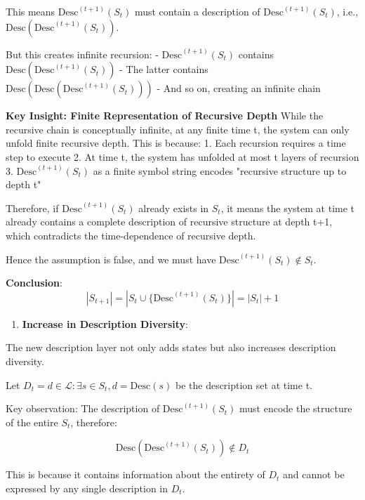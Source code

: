   This means $\text{Desc}^{(t+1)}(S_t)$ must contain a description of $\text{Desc}^{(t+1)}(S_t)$, i.e., $\text{Desc}(\text{Desc}^{(t+1)}(S_t))$.
  
  But this creates infinite recursion:
  - $\text{Desc}^{(t+1)}(S_t)$ contains $\text{Desc}(\text{Desc}^{(t+1)}(S_t))$
  - The latter contains $\text{Desc}(\text{Desc}(\text{Desc}^{(t+1)}(S_t)))$
  - And so on, creating an infinite chain
  
  \textbf{Key Insight: Finite Representation of Recursive Depth}
  While the recursive chain is conceptually infinite, at any finite time t, the system can only unfold finite recursive depth.
  This is because:
  1. Each recursion requires a time step to execute
  2. At time t, the system has unfolded at most t layers of recursion
  3. $\text{Desc}^{(t+1)}(S_t)$ as a finite symbol string encodes "recursive structure up to depth t"
  
  Therefore, if $\text{Desc}^{(t+1)}(S_t)$ already exists in $S_t$, it means the system at time t already contains
  a complete description of recursive structure at depth t+1, which contradicts the time-dependence of recursive depth.
  
  Hence the assumption is false, and we must have $\text{Desc}^{(t+1)}(S_t) \notin S_t$.
  
  \textbf{Conclusion}:
\begin{equation}
|S_{t+1}| = |S_t \cup \{\text{Desc}^{(t+1)}(S_t)\}| = |S_t| + 1
\end{equation}

\begin{enumerate}
\item \textbf{Increase in Description Diversity}:
\end{enumerate}
  The new description layer not only adds states but also increases description diversity.
  
  Let $D_t = {d \in \mathcal{L}: \exists s \in S_t, d = \text{Desc}(s)}$ be the description set at time t.
  
  Key observation: The description of $\text{Desc}^{(t+1)}(S_t)$ must encode the structure of the entire $S_t$, therefore:
  
\begin{equation}
\text{Desc}(\text{Desc}^{(t+1)}(S_t)) \notin D_t
\end{equation}
  
  This is because it contains information about the entirety of $D_t$ and cannot be expressed by any single description in $D_t$.

